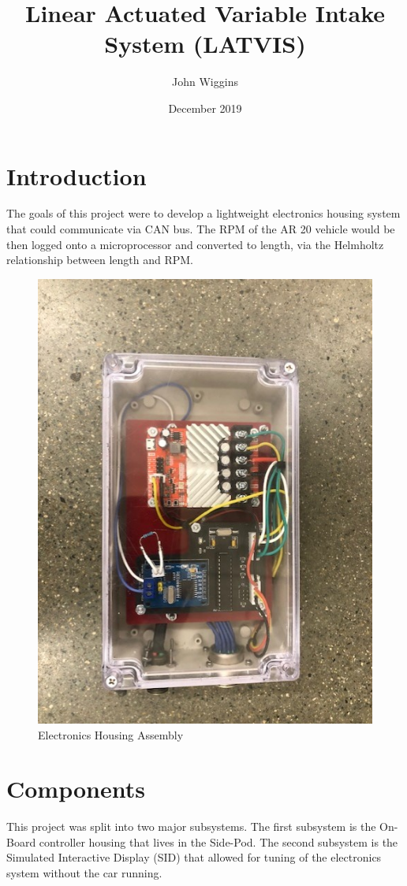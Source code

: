 \documentclass{article}
\title{Linear Actuated Variable Intake System (LATVIS)}
\author{John Wiggins }
\date{December 2019}
\begin{document}
\maketitle

\section{Introduction}
The goals of this project were to develop a lightweight electronics housing system that could communicate via CAN bus. The RPM of the AR 20 vehicle would be then logged onto a microprocessor and converted to length, via the Helmholtz relationship between length and RPM.


\begin{figure}[h!]
\centering
\includegraphics[scale=0.5, angle = 90]{Electronics_Housing.jpg}
\caption{Electronics Housing Assembly}
\label{fig:assembly}
\end{figure}

\section{Components}
This project was split into two major subsystems. The first subsystem is the On-Board controller housing that lives in the Side-Pod. The second subsystem is the Simulated Interactive Display (SID) that allowed for tuning of the electronics system without the car running.
\end{document}
